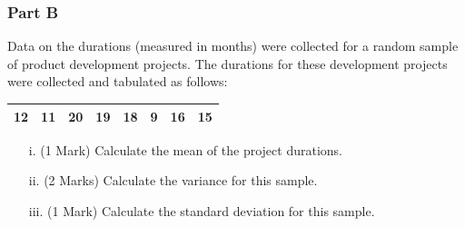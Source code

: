 \documentclass[a4paper,12pt]{article}
\begin{document}
\subsubsection*{Part B} %
Data on the durations (measured in months) were collected for a random sample of product development projects.
The durations for these development projects were collected and tabulated as follows:

\begin{table}[ht]
	\begin{center}
		\begin{tabular}{|rrrrrrrr|}
			
			\hline
			12 & 11 & 20 & 19 & 18 & 9 & 16 & 15 \\
			\hline
		\end{tabular}
	\end{center}
\end{table}

\begin{itemize}
	\item[i.](1 Mark) Calculate the mean of the project durations.
	\item[ii.](2 Marks) Calculate the variance for this sample.
	\item[iii.](1 Mark) Calculate the standard deviation for this sample.
\end{itemize}
\end{document}
